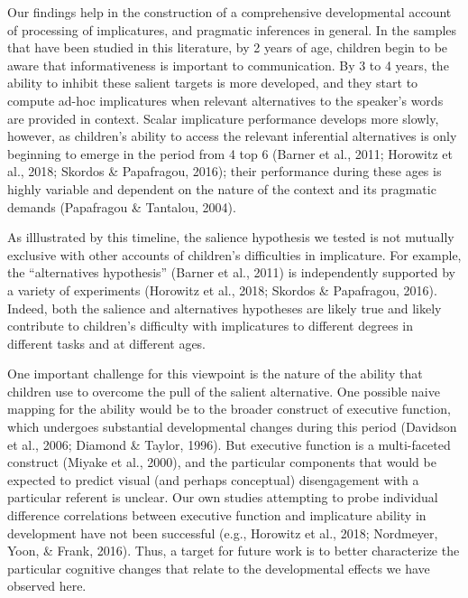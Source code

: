 \documentclass[man]{apa6}
\begin{document}
Our findings help in the construction of a comprehensive developmental
account of processing of implicatures, and pragmatic inferences in
general. In the samples that have been studied in this literature, by 2
years of age, children begin to be aware that informativeness is
important to communication. By 3 to 4 years, the ability to inhibit
these salient targets is more developed, and they start to compute
ad-hoc implicatures when relevant alternatives to the speaker's words
are provided in context. Scalar implicature performance develops more
slowly, however, as children's ability to access the relevant
inferential alternatives is only beginning to emerge in the period from
4 top 6 (Barner et al., 2011; Horowitz et al., 2018; Skordos \&
Papafragou, 2016); their performance during these ages is highly
variable and dependent on the nature of the context and its pragmatic
demands (Papafragou \& Tantalou, 2004).

As illlustrated by this timeline, the salience hypothesis we tested is
not mutually exclusive with other accounts of children's difficulties in
implicature. For example, the \enquote{alternatives hypothesis} (Barner
et al., 2011) is independently supported by a variety of experiments
(Horowitz et al., 2018; Skordos \& Papafragou, 2016). Indeed, both the
salience and alternatives hypotheses are likely true and likely
contribute to children's difficulty with implicatures to different
degrees in different tasks and at different ages.

One important challenge for this viewpoint is the nature of the ability
that children use to overcome the pull of the salient alternative. One
possible naive mapping for the ability would be to the broader construct
of executive function, which undergoes substantial developmental changes
during this period (Davidson et al., 2006; Diamond \& Taylor, 1996). But
executive function is a multi-faceted construct (Miyake et al., 2000),
and the particular components that would be expected to predict visual
(and perhaps conceptual) disengagement with a particular referent is
unclear. Our own studies attempting to probe individual difference
correlations between executive function and implicature ability in
development have not been successful (e.g., Horowitz et al., 2018;
Nordmeyer, Yoon, \& Frank, 2016). Thus, a target for future work is to
better characterize the particular cognitive changes that relate to the
developmental effects we have observed here.
\end{document}
